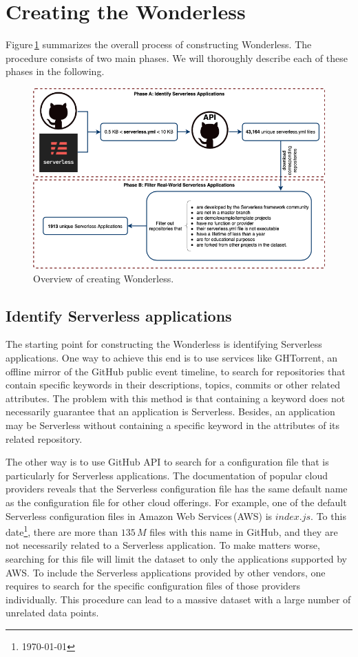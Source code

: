 \section{Creating the Wonderless}
\label{dataset}

Figure\,\ref{fig:overview} summarizes the overall process of constructing Wonderless. 
The procedure consists of two main phases. 
We will thoroughly describe each of these phases in the following.

\begin{figure}
	\centering
	\includegraphics[scale=0.55]{figures/msr}
	\caption{Overview of creating Wonderless.}
	\label{fig:overview}
\end{figure}

\subsection{Identify Serverless applications} \label{phaseA}
The starting point for constructing the Wonderless is identifying Serverless 
applications. One way to achieve this end is to use services like 
GHTorrent\cite{gousios2012ghtorrent}, 
an offline mirror of the GitHub public event timeline, to search for repositories 
that contain specific keywords in their descriptions, topics, commits or other 
related attributes. The problem with this method is that containing a keyword 
does not necessarily guarantee that an application is Serverless. Besides, an 
application may be Serverless without containing a specific keyword in the 
attributes of its related repository.

The other way is to use GitHub API to search for a configuration file that is 
particularly for Serverless applications. The documentation of popular cloud 
providers reveals that the Serverless configuration file has the same default 
name as the configuration file for other cloud offerings. 
For example, one of the default Serverless configuration files in Amazon 
Web Services\,(AWS) is $index.js$. To this date\footnote{\today}, there 
are more than $135 \, M$ files with this name in GitHub, and they are not 
necessarily related to a Serverless application. To make matters worse, 
searching for this file will limit the dataset to only the applications supported 
by AWS. To include the Serverless applications provided by other vendors, 
one requires to search for the specific configuration files of those providers 
individually. This procedure can lead to a massive dataset with a large number 
of unrelated data points.

